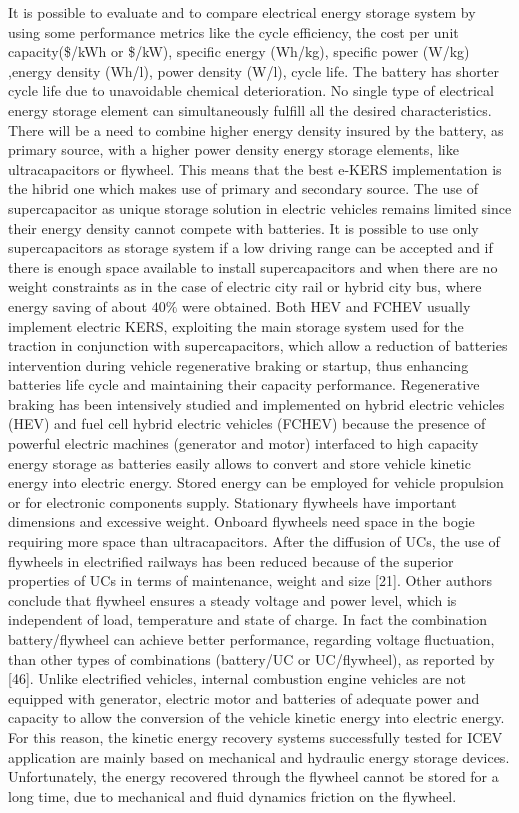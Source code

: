 \documentclass[11pt]{article}
\begin{document}
It is possible to evaluate and to compare electrical energy storage system by using some performance metrics like the cycle efficiency, the cost per unit capacity(\$/kWh or \$/kW), specific energy (Wh/kg), specific power (W/kg) ,energy density (Wh/l), power density (W/l), cycle life. The battery has shorter cycle life due to unavoidable chemical deterioration. No single type of electrical energy storage element can simultaneously fulfill all the desired characteristics. There will be a need to combine higher energy density insured by the battery, as primary source, with a higher power density energy storage elements, like ultracapacitors or flywheel. This means that the best e-KERS implementation is the hibrid one which makes use of primary and secondary source. The use of supercapacitor as unique storage solution in electric vehicles remains limited since their energy density cannot compete with batteries. It is possible to use only supercapacitors as storage system if a low driving range can be accepted and if there is enough space available to install supercapacitors and when there are no weight constraints as in the case of electric city rail or hybrid city bus, where energy saving of about $40\%$ were obtained. Both HEV  and FCHEV  usually implement electric KERS, exploiting the main storage system used for the traction in conjunction with supercapacitors, which allow a reduction of batteries intervention during vehicle regenerative braking or startup, thus enhancing batteries life cycle and maintaining their capacity performance. Regenerative braking has been intensively studied and implemented on hybrid electric vehicles (HEV) and fuel cell hybrid electric vehicles (FCHEV) because the presence of powerful electric machines (generator and motor) interfaced to high capacity energy storage as batteries easily allows to convert and store vehicle kinetic energy into electric energy. Stored energy can be employed for vehicle propulsion or for electronic components supply.  Stationary flywheels have important dimensions and excessive weight. Onboard flywheels need space in the bogie requiring more space than ultracapacitors. After the diffusion of UCs, the use of flywheels in electrified railways has been reduced because of the superior properties of UCs in terms of maintenance, weight and size [21]. Other authors conclude that flywheel ensures a steady voltage and power level, which is independent of load, temperature and state of charge. In fact the combination battery/flywheel can achieve better performance, regarding voltage fluctuation, than other types of combinations (battery/UC or UC/flywheel), as reported by [46]. Unlike electrified vehicles, internal combustion engine vehicles are not equipped with generator, electric motor and batteries of adequate power and capacity to allow the conversion of the vehicle kinetic energy into electric energy. For this reason, the kinetic energy recovery systems successfully tested for ICEV application are mainly based on mechanical and hydraulic energy storage devices. Unfortunately, the energy recovered through the flywheel cannot be stored for a long time, due to mechanical and fluid dynamics friction on the flywheel.
\end{document}

